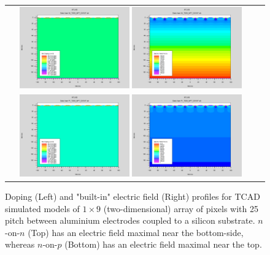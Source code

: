 \begin{figure}[!htb]
  \begin{center}
    \begin{tabular}{cc}
      \includegraphics[width=0.45\textwidth]{fig_FastTiming/Net_Doping_nonn.png}
      \includegraphics[width=0.45\textwidth]{fig_FastTiming/ElectricField_nonn.png} \\
      \includegraphics[width=0.45\textwidth]{fig_FastTiming/Net_Doping_nonp.png}
      \includegraphics[width=0.45\textwidth]{fig_FastTiming/ElectricField_nonp.png} \\
    \end{tabular}
    \caption{Doping (Left) and "built-in" electric field (Right) profiles for TCAD simulated models of $1 \times 9$ (two-dimensional) array of pixels with 25 \si{\micron} pitch between aluminium electrodes coupled to a silicon substrate.
            $n$-on-$n$ (Top) has an electric field maximal near the bottom-side, whereas $n$-on-$p$ (Bottom) has an electric field maximal near the top.
            }
    \label{Doping_ElectricField}
  \end{center}
\end{figure}

